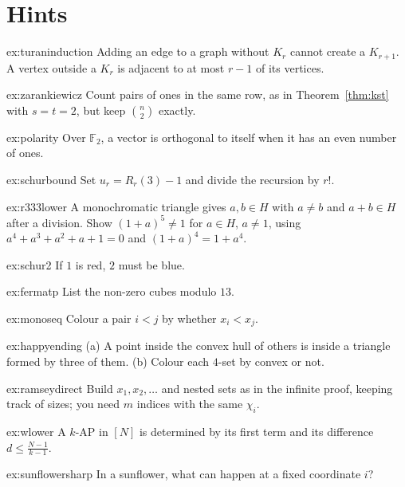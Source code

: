 \section{Hints}

\begin{hint}{ex:turaninduction}
Adding an edge to a graph without $K_r$ cannot create a $K_{r+1}$. A vertex outside a $K_r$ is adjacent to at most $r-1$ of its vertices.
\end{hint}
\begin{hint}{ex:zarankiewicz}
Count pairs of ones in the same row, as in Theorem~\ref{thm:kst} with $s=t=2$, but keep $\binom n2$ exactly.
\end{hint}
\begin{hint}{ex:polarity}
Over $\mathbb F_2$, a vector is orthogonal to itself when it has an even number of ones.
\end{hint}
\begin{hint}{ex:schurbound}
Set $u_r=R_r(3)-1$ and divide the recursion by $r!$.
\end{hint}
\begin{hint}{ex:r333lower}
A monochromatic triangle gives $a,b\in H$ with $a\ne b$ and $a+b\in H$ after a division. Show $(1+a)^5\ne1$ for $a\in H$, $a\ne1$, using $a^4+a^3+a^2+a+1=0$ and $(1+a)^4=1+a^4$.
\end{hint}
\begin{hint}{ex:schur2}
If $1$ is red, $2$ must be blue.
\end{hint}
\begin{hint}{ex:fermatp}
List the non-zero cubes modulo $13$.
\end{hint}
\begin{hint}{ex:monoseq}
Colour a pair $i<j$ by whether $x_i<x_j$.
\end{hint}
\begin{hint}{ex:happyending}
(a) A point inside the convex hull of others is inside a triangle formed by three of them. (b) Colour each $4$-set by convex or not.
\end{hint}
\begin{hint}{ex:ramseydirect}
Build $x_1,x_2,\dots$ and nested sets as in the infinite proof, keeping track of sizes; you need $m$ indices with the same $\chi_i$.
\end{hint}
\begin{hint}{ex:wlower}
A $k$-AP in $[N]$ is determined by its first term and its difference $d\le\frac{N-1}{k-1}$.
\end{hint}
\begin{hint}{ex:sunflowersharp}
In a sunflower, what can happen at a fixed coordinate $i$?
\end{hint}

